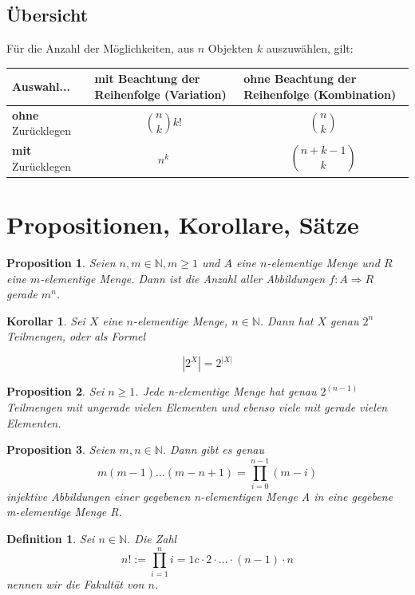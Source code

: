 \documentclass[12pt, twoside]{article}
\newcommand{\N}{\mathbb{N}}
\newtheorem{Kor}{Korollar}[subsection]
\newtheorem{Prop}{Proposition}[subsection]
\newtheorem{Def}{Definition}[subsection]
\begin{document}
\subsection{Übersicht}
Für die Anzahl der Möglichkeiten, aus $n$ Objekten $k$ auszuwählen, gilt: \\


\begin{centering}
\begin{tabular}{l||p{4.5cm}|p{4.5cm}}
Auswahl... & \textbf{mit} Beachtung der Reihenfolge (Variation) & \textbf{ohne} Beachtung der Reihenfolge (Kombination) \\
\hline
\hline
\textbf{ohne} Zurücklegen &  $$\binom{n}{k}k!$$  & $$\binom{n}{k}$$  \\
\hline
\textbf{mit} Zurücklegen & $$n^k$$ & $$\binom{n+k-1}{k}$$ \\

\end{tabular}
\end{centering}


\section{Propositionen, Korollare, Sätze}
\begin{Prop} Seien $n, m \in \N, m \ge 1$ und $A$ eine $n$-elementige Menge und $R$ eine $m$-elementige Menge. Dann ist die 
Anzahl aller Abbildungen $f:A \Rightarrow R$ gerade $m^n$.
\end{Prop}
\begin{Kor} 
Sei $X$ eine $n$-elementige Menge, $n \in \N$. Dann hat $X$ genau $2^n$ Teilmengen, oder als Formel
\end{Kor}
$$|2^X|=2^{|X|}$$





\begin{Prop} Sei  $n \ge 1$. Jede n-elementige Menge hat genau $2^{(n-1)}$ Teilmengen mit ungerade vielen Elementen und 
ebenso viele mit gerade vielen Elementen. 
\end{Prop}

\begin{Prop} Seien $m, n \in \N $. Dann gibt es genau 
$$
m(m-1)\dots (m-n+1)= \prod_{i=0}^{n-1} (m-i)
$$
injektive Abbildungen einer gegebenen n-elementigen Menge A in eine gegebene m-elementige Menge R.
\end{Prop}

\begin{Def} Sei $n \in \N$. Die Zahl
$$
n!:= \prod_{i=1}^{n}i=1c\cdot 2 \cdot \ldots \cdot(n-1)\cdot n
$$
nennen wir die Fakultät von $n$.
\end{Def}
\end{document}

